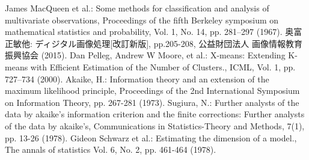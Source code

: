 \begin{thebibliography}{99}
    James MacQueen et al.:
    Some methods for classification and analysis of multivariate observations,
    Proceedings of the fifth Berkeley symposium on mathematical statistics and probability,
    Vol. 1, No. 14, pp. 281--297 (1967).
    奥富 正敏他:
    ディジタル画像処理[改訂新版],
    pp.205-208, 公益財団法人 画像情報教育振興協会 (2015).
    Dan Pelleg, Andrew W Moore, et al.:
    X-means: Extending K-means with Efficient Estimation of the Number of Clusters.,
    ICML, Vol. 1, pp. 727--734 (2000).
    Akaike, H.: 
    Information theory and an extension of the maximum likelihood principle, 
    Proceedings of the 2nd International Symposium on Information Theory, 
    pp. 267-281 (1973).
    Sugiura, N.:
    Further analysts of the data by akaike's information criterion and the finite corrections:
    Further analysts of the data by akaike's, 
    Communications in Statistics-Theory and Methods, 7(1), pp. 13-26 (1978).
    Gideon Schwarz et al.:
    Estimating the dimension of a model.,
    The annals of statistics Vol. 6, No. 2, pp. 461-464 (1978).
\end{thebibliography}
